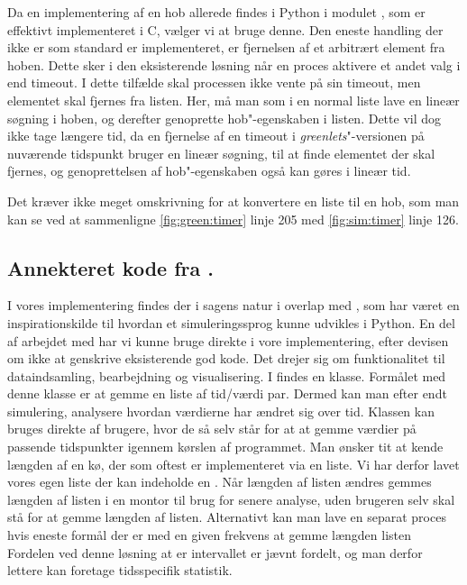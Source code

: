 Da en implementering af en hob allerede findes i Python i modulet , som er effektivt implementeret i C, vælger vi at bruge denne. Den eneste handling
der ikke er som standard er implementeret, er fjernelsen af et arbitrært element fra hoben. Dette sker i den eksisterende løsning når en proces
aktivere et andet valg i  end timeout. I dette tilfælde skal
processen ikke vente på sin timeout, men elementet skal fjernes fra
 listen. Her, må man som i
en normal liste lave en lineær søgning i hoben, og derefter genoprette
hob"-egenskaben i listen. Dette vil dog ikke tage længere tid, da en fjernelse af en timeout i \emph{greenlets}"-versionen på nuværende
tidspunkt bruger en lineær søgning, til at finde elementet der skal
fjernes, og genoprettelsen af hob"-egenskaben også kan gøres i lineær tid.

Det kræver ikke meget omskrivning for at konvertere en liste til en hob, som man kan se ved at sammenligne \cref{fig:green:timer} linje 205 med \cref{fig:sim:timer} linje 126. 

\subsection{Annekteret kode fra \simpy.}
I vores implementering findes der i sagens natur i overlap med \simpy, som har været en inspirationskilde til hvordan et simuleringssprog kunne udvikles i Python. En del af arbejdet med \simpy har vi kunne bruge direkte i vore implementering, efter devisen om ikke at genskrive eksisterende god kode. Det drejer sig om funktionalitet til dataindsamling, bearbejdning og visualisering. I \simpy findes en klasse. Formålet med denne klasse er at gemme en liste af tid/værdi par. Dermed kan man efter endt simulering, analysere  hvordan værdierne har ændret sig over tid. Klassen  kan bruges direkte af brugere, hvor de så selv  står for at at gemme værdier på passende tidspunkter igennem kørslen af programmet. Man ønsker tit at kende længden af en kø, der som oftest er implementeret via en liste. Vi har derfor lavet vores egen liste der kan indeholde en . Når længden af listen ændres gemmes længden af listen i en montor til brug for senere analyse, uden brugeren selv skal stå for at gemme længden af listen. Alternativt kan man lave en separat proces hvis eneste formål der er med en given frekvens at gemme længden listen Fordelen ved denne løsning at er intervallet er jævnt fordelt, og man derfor lettere kan foretage tidsspecifik statistik.


